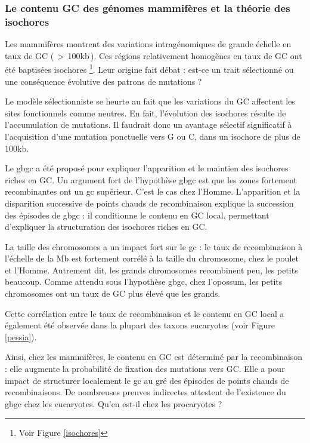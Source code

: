\documentclass[11pt, oneside]{scrartcl}
\begin{document}
\subsubsection{Le contenu GC des génomes mammifères et la théorie des isochores}
\label{sec:orgheadline12}
Les mammifères montrent des variations intragénomiques de grande échelle en taux
de GC\cite{eyre-walker_evolution_2001} ( \(>\) 100kb ). Ces régions relativement
homogènes en taux de GC ont été baptisées isochores \footnote{Voir Figure
\ref{isochores}}. Leur origine fait débat : est-ce un trait sélectionné ou une
conséquence évolutive des patrons de mutations ?

Le modèle sélectionniste se heurte au fait que les variations du GC affectent
les sites fonctionnels comme neutres. En fait, l'évolution des isochores résulte
de l'accumulation de mutations. Il faudrait donc un avantage sélectif
significatif à l'acquisition d'une mutation ponctuelle vers G ou C, dans un
isochore de plus de 100kb.

Le \ac{gbgc} a été proposé pour expliquer l'apparition et le maintien des isochores
riches en GC\cite{duret_new_2006}. Un argument fort de l'hypothèse \ac{gbgc} est que
les zones fortement recombinantes ont un \ac{gc} supérieur. C'est le cas chez
l'Homme\cite{duret_impact_2008, berglund_hotspots_2009}. L'apparition et la
disparition successive de points chauds de recombinaison explique la succession
des épisodes de \ac{gbgc} : il conditionne le contenu en GC local, permettant
d'expliquer la structuration des isochores riches en GC. 

La taille des chromosomes a un impact fort sur le \ac{gc} : le taux de
recombinaison à l'échelle de la Mb est fortement corrélé à la taille du
chromosome, chez le poulet et l'Homme\cite{kaback_chromosome_1999}. Autrement
dit, les grands chromosomes recombinent peu, les petits beaucoup. Comme attendu
sous l'hypothèse \ac{gbgc}, chez l'opossum, les petits chromosomes ont un taux
de GC plus élevé que les grands.

Cette corrélation entre le taux de recombinaison et le contenu en GC local a
également été observée dans la plupart des taxons eucaryotes (voir Figure
\ref{pessia}). 

\begin{transition}
  Ainsi, chez les mammifères, le contenu en GC est déterminé par la
  recombinaison : elle augmente la probabilité de fixation des mutations vers
  GC. Elle a pour impact de structurer localement le \ac{gc} au gré des épisodes
  de points chauds de recombinaisons. De nombreuses preuves indirectes attestent
  de l'existence du \ac{gbgc} chez les eucaryotes. Qu'en est-il chez les
  procaryotes ?
\end{transition}
\end{document}
